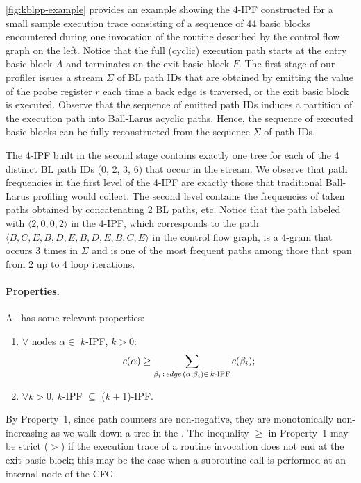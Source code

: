 \begin{example} \myfigure\ref{fig:kblpp-example} provides an example showing the 4-IPF constructed for a small sample execution trace consisting of a sequence of 44 basic blocks encountered during one invocation of the routine described by the control flow graph on the left. Notice that the full (cyclic) execution path starts at the entry basic block $A$ and terminates on the exit basic block $F$. The first stage of our profiler issues a stream $\Sigma$ of BL path IDs that are obtained by emitting the value of the probe register $r$ each time a back edge is traversed, or the exit basic block is executed. Observe that the sequence of emitted path IDs induces a partition of the execution path into Ball-Larus acyclic paths. Hence, the sequence of executed basic blocks can be fully reconstructed from the sequence $\Sigma$ of path IDs.

The 4-IPF built in the second stage contains exactly one tree for each of the 4 distinct BL path IDs (0, 2, 3, 6) that occur in the stream. We observe that path frequencies in the first level of the 4-IPF are exactly those that traditional Ball-Larus profiling would collect. The second level contains the frequencies of taken paths obtained by concatenating 2 BL paths, etc. Notice that the path labeled with $\langle 2, 0, 0, 2\rangle$ in the 4-IPF, which corresponds to the path $\langle B, C, E, B, D, E, B, D, E, B, C, E \rangle$ in the control flow graph, is a 4-gram that occurs 3 times in $\Sigma$ and is one of the most frequent paths among those that span from 2 up to 4 loop iterations.
\end{example}

\paragraph*{Properties.}
A \kipf\ has some relevant properties:
\begin{enumerate}
\item $\forall$ nodes $\alpha\in$ $k$-IPF, $k>0$: $$c(\alpha)\ge\sum_{\beta_i\,:\,edge\,(\alpha,\beta_i)\in\,k\mbox{\scriptsize-IPF}} c(\beta_i);$$
\item $\forall k>0$, $k$-IPF $\subseteq$ ($k+1$)-IPF.
\end{enumerate}

\noindent By Property~1, since path counters are non-negative, they are monotonically non-increasing as we walk down a tree in the \kipf. The inequality $\ge$ in Property~1 may be strict ($>$) if the execution trace of a routine invocation does not end at the exit basic block; this may be the case when a subroutine call is performed at an internal node of the CFG.

